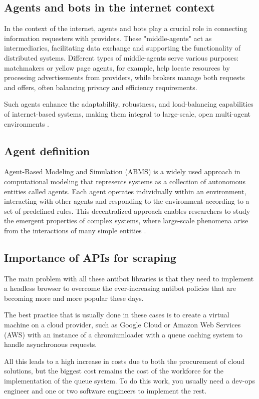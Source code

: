 \subsection{Agents and bots in the internet context}
In the context of the internet, agents and bots play a crucial role in connecting information requesters with providers. These "middle-agents" act as intermediaries, facilitating data exchange and supporting the functionality of distributed systems. Different types of middle-agents serve various purposes: matchmakers or yellow page agents, for example, help locate resources by processing advertisements from providers, while brokers manage both requests and offers, often balancing privacy and efficiency requirements. 

Such agents enhance the adaptability, robustness, and load-balancing capabilities of internet-based systems, making them integral to large-scale, open multi-agent environments \cite{decker1997}.

\subsection{Agent definition}
Agent-Based Modeling and Simulation (ABMS) is a widely used approach in computational modeling that represents systems as a collection of autonomous entities called agents. Each agent operates individually within an environment, interacting with other agents and responding to the environment according to a set of predefined rules. This decentralized approach enables researchers to study the emergent properties of complex systems, where large-scale phenomena arise from the interactions of many simple entities \cite{abar2017}.

\subsection{Importance of APIs for scraping}
The main problem with all these antibot libraries is that they need to implement a headless browser to overcome the ever-increasing antibot policies that are becoming more and more popular these days.

The best practice that is usually done in these cases is to create a virtual machine on a cloud provider, such as Google Cloud or Amazon Web Services (AWS) with an instance of a chromiumloader with a queue caching system to handle asynchronous requests.

All this leads to a high increase in costs due to both the procurement of cloud solutions, but the biggest cost remains the cost of the workforce for the implementation of the queue system. To do this work, you usually need a dev-ops engineer and one or two software engineers to implement the rest.


